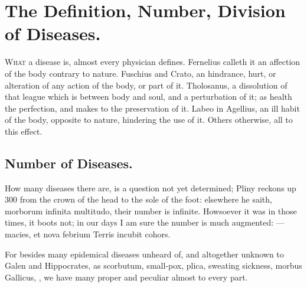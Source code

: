 {\section{The Definition, Number, Division of Diseases.}

\lettrine{W}{hat} a disease is, almost every physician defines. Fernelius
calleth it an affection of the body contrary to nature. Fuschius
and Crato, an hindrance, hurt, or alteration of any action of the body,
or part of it. Tholosanus, a dissolution of that league which is
between body and soul, and a perturbation of it; as health the
perfection, and makes to the preservation of it. Labeo in
Agellius, an ill habit of the body, opposite to nature, hindering the
use of it. Others otherwise, all to this effect.

\subsection{Number of Diseases.}
How many diseases there are, is a question not
yet determined; Pliny reckons up 300 from the crown of the head to
the sole of the foot: elsewhere he saith, morborum infinita multitudo,
their number is infinite. Howsoever it was in those times, it boots
not; in our days I am sure the number is much augmented:
---macies, et nova febrium
Terris incubit cohors.

For besides many epidemical diseases unheard of, and altogether unknown
to Galen and Hippocrates, as scorbutum, small-pox, plica, sweating
sickness, morbus Gallicus, \etc{}, we have many proper and peculiar almost
to every part.
}
